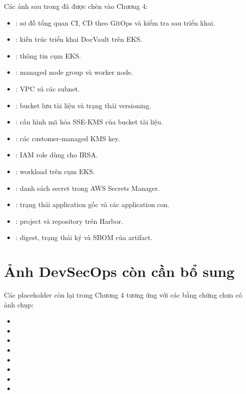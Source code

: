 Các ảnh sau trong  đã được chèn vào Chương 4:

\begin{itemize}
  \item {}: sơ đồ tổng quan CI, CD theo GitOps và kiểm tra sau triển khai.
  \item {}: kiến trúc triển khai DocVault trên EKS.
  \item {}: thông tin cụm EKS.
  \item {}: managed node group và worker node.
  \item {}: VPC và các subnet.
  \item {}: bucket lưu tài liệu và trạng thái versioning.
  \item {}: cấu hình mã hóa SSE-KMS của bucket tài liệu.
  \item {}: các customer-managed KMS key.
  \item {}: IAM role dùng cho IRSA.
  \item {}: workload trên cụm EKS.
  \item {}: danh sách secret trong AWS Secrets Manager.
  \item {}: trạng thái application gốc và các application con.
  \item {}: project và repository trên Harbor.
  \item {}: digest, trạng thái ký và SBOM của artifact.
\end{itemize}

\section{Ảnh DevSecOps còn cần bổ sung}

Các placeholder còn lại trong Chương 4 tương ứng với các bằng chứng chưa có ảnh chụp:

\begin{itemize}
  \item {}
  \item {}
  \item {}
  \item {}
  \item {}
  \item {}
  \item {}
  \item {}
\end{itemize}

